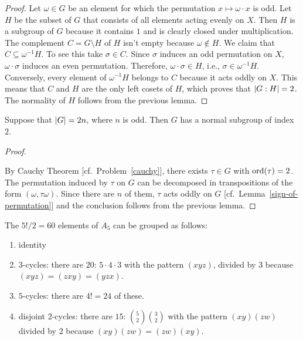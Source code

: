 \begin{proof}
    Let $\omega\in G$ be an element for which the permutation $x\mapsto\omega\cdot x$ is odd. Let $H$ be the subset of $G$ that consists of all elements acting evenly on $X$. Then $H$ is a subgroup of $G$ because it contains $1$ and is clearly closed under multiplication. The complement $C=G\setminus H$ of $H$ isn't empty because $\omega\notin H$. We claim that $C\subseteq \omega^{-1}H$. To see this take $\sigma\in C$. Since $\sigma$ induces an odd permutation on $X$, $\omega\cdot\sigma$ induces an even permutation. Therefore, $\omega\cdot\sigma\in H$, i.e., $\sigma\in\omega^{-1}H$. Conversely, every element of $\omega^{-1}H$ belongs to $C$ because it acts oddly on $X$. This means that $C$ and $H$ are the only left cosets of $H$, which proves that $\left\vert{G: H}\right\vert=2$. The normality of $H$ follows from the previous lemma.
\end{proof}

\begin{thm}\label{thm-2odd}
    Suppose that\/ $\left\vert{G}\right\vert=2n$, where $n$ is odd. Then\/ $G$ has a normal subgroup of index $2$.
\end{thm}

\begin{proof}${}$

By Cauchy Theorem [cf.~Problem~\ref{cauchy}], there exists $\tau\in G$ with ${\rm ord}(\tau)=2$. The permutation induced by $\tau$ on $G$ can be decomposed in transpositions of the form $(\omega,\tau\omega)$. Since there are $n$ of them, $\tau$ acts oddly on $G$ [cf.~Lemma~\ref{sign-of-permutation}] and the conclusion follows from the previous lemma.  \end{proof}

\begin{xmpl}\label{A5-elements}
    The $5!/2=60$ elements of $A_5$ can be grouped as follows:
    \begin{enumerate}[-]
        \item {\upshape identity}
        \item {\upshape $3$-cycles:} there are $20$: $5\cdot4\cdot3$ with the pattern $(xyz)$, divided by $3$ because $(xyz)=(zxy)=(yzx)$.
        \item {\upshape $5$-cycles:} there are $4!=24$ of these.
        \item {\upshape disjoint $2$-cycles:} there are $15$: $\binom52\binom32$ with the pattern $(xy)(zw)$ divided by $2$ because $(xy)(zw)=(zw)(xy)$.
    \end{enumerate}
\end{xmpl}

